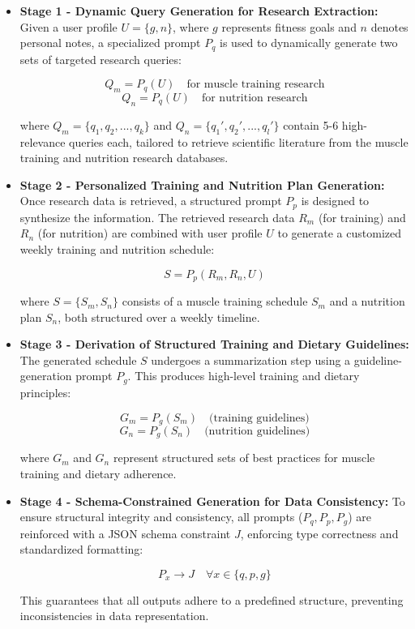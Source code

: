 \documentclass[conference]{IEEEtran}
\begin{document}
\begin{itemize}
    \item \textbf{Stage 1 - Dynamic Query Generation for Research Extraction:}  
    Given a user profile $U = \{g, n\}$, where $g$ represents fitness goals and $n$ denotes personal notes, a specialized prompt $P_q$ is used to dynamically generate two sets of targeted research queries:
    
    \[
    Q_m = P_q(U) \quad \text{for muscle training research}
    \]
    \[
    Q_n = P_q(U) \quad \text{for nutrition research}
    \]
    
    where $Q_m = \{q_1, q_2, ..., q_k\}$ and $Q_n = \{q_1', q_2', ..., q_l'\}$ contain 5-6 high-relevance queries each, tailored to retrieve scientific literature from the muscle training and nutrition research databases.

    \item \textbf{Stage 2 - Personalized Training and Nutrition Plan Generation:}  
    Once research data is retrieved, a structured prompt $P_p$ is designed to synthesize the information. The retrieved research data $R_m$ (for training) and $R_n$ (for nutrition) are combined with user profile $U$ to generate a customized weekly training and nutrition schedule:

    \[
    S = P_p(R_m, R_n, U)
    \]

    where $S = \{S_m, S_n\}$ consists of a muscle training schedule $S_m$ and a nutrition plan $S_n$, both structured over a weekly timeline.

    \item \textbf{Stage 3 - Derivation of Structured Training and Dietary Guidelines:}  
    The generated schedule $S$ undergoes a summarization step using a guideline-generation prompt $P_g$. This produces high-level training and dietary principles:

    \[
    G_m = P_g(S_m) \quad \text{(training guidelines)}
    \]
    \[
    G_n = P_g(S_n) \quad \text{(nutrition guidelines)}
    \]

    where $G_m$ and $G_n$ represent structured sets of best practices for muscle training and dietary adherence.

    \item \textbf{Stage 4 - Schema-Constrained Generation for Data Consistency:}  
    To ensure structural integrity and consistency, all prompts ($P_q, P_p, P_g$) are reinforced with a JSON schema constraint $J$, enforcing type correctness and standardized formatting:

    \[
    P_x \rightarrow J \quad \forall x \in \{q, p, g\}
    \]

    This guarantees that all outputs adhere to a predefined structure, preventing inconsistencies in data representation.
\end{itemize}
\end{document}
